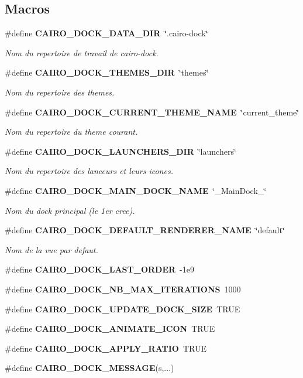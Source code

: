 \subsection*{Macros}
\begin{CompactItemize}
\item 
\#define {\bf CAIRO\_\-DOCK\_\-DATA\_\-DIR}~\char`\"{}.cairo-dock\char`\"{}
\begin{CompactList}\small\item\em Nom du repertoire de travail de cairo-dock. \item\end{CompactList}\item 
\#define {\bf CAIRO\_\-DOCK\_\-THEMES\_\-DIR}~\char`\"{}themes\char`\"{}
\begin{CompactList}\small\item\em Nom du repertoire des themes. \item\end{CompactList}\item 
\#define {\bf CAIRO\_\-DOCK\_\-CURRENT\_\-THEME\_\-NAME}~\char`\"{}current\_\-theme\char`\"{}
\begin{CompactList}\small\item\em Nom du repertoire du theme courant. \item\end{CompactList}\item 
\#define {\bf CAIRO\_\-DOCK\_\-LAUNCHERS\_\-DIR}~\char`\"{}launchers\char`\"{}
\begin{CompactList}\small\item\em Nom du repertoire des lanceurs et leurs icones. \item\end{CompactList}\item 
\#define {\bf CAIRO\_\-DOCK\_\-MAIN\_\-DOCK\_\-NAME}~\char`\"{}\_\-MainDock\_\-\char`\"{}
\begin{CompactList}\small\item\em Nom du dock principal (le 1er cree). \item\end{CompactList}\item 
\#define {\bf CAIRO\_\-DOCK\_\-DEFAULT\_\-RENDERER\_\-NAME}~\char`\"{}default\char`\"{}
\begin{CompactList}\small\item\em Nom de la vue par defaut. \item\end{CompactList}\item 
\#define {\bf CAIRO\_\-DOCK\_\-LAST\_\-ORDER}~-1e9
\item 
\#define {\bf CAIRO\_\-DOCK\_\-NB\_\-MAX\_\-ITERATIONS}~1000
\item 
\#define {\bf CAIRO\_\-DOCK\_\-UPDATE\_\-DOCK\_\-SIZE}~TRUE
\item 
\#define {\bf CAIRO\_\-DOCK\_\-ANIMATE\_\-ICON}~TRUE
\item 
\#define {\bf CAIRO\_\-DOCK\_\-APPLY\_\-RATIO}~TRUE
\item 
\#define {\bf CAIRO\_\-DOCK\_\-MESSAGE}(s,...)
\end{CompactItemize}

